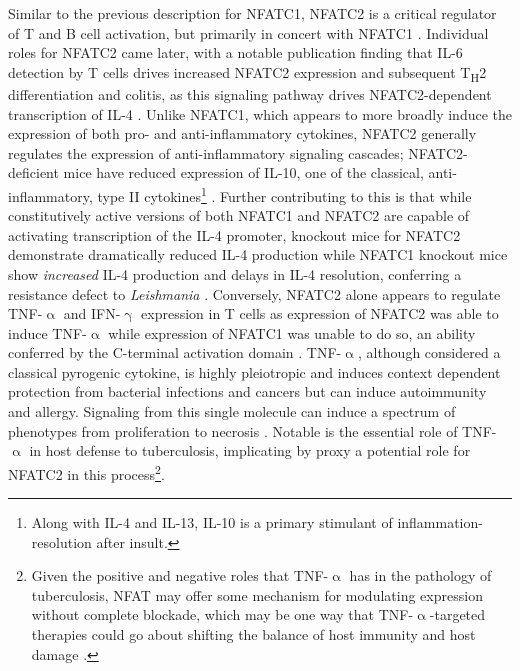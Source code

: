 Similar to the previous description for NFATC1, NFATC2 is a critical regulator of T and B cell activation, but primarily in concert with NFATC1 \citep{Peng2001}. Individual roles for NFATC2 came later, with a notable publication finding that IL\hyp{}6 detection by T cells drives increased NFATC2 expression and subsequent T\textsubscript{H}2 differentiation and colitis, as this signaling pathway drives NFATC2\hyp{}dependent transcription of IL\hyp{}4 \citep{Diehl2002, Weigmann2008}. Unlike NFATC1, which appears to more broadly induce the expression of both pro\hyp{} and anti\hyp{}inflammatory cytokines, NFATC2 generally regulates the expression of anti\hyp{}inflammatory signaling cascades; NFATC2\hyp{}deficient mice have reduced expression of IL\hyp{}10, one of the classical, anti\hyp{}inflammatory, type II cytokines\footnote{Along with IL\hyp{}4 and IL\hyp{}13, IL\hyp{}10 is a primary stimulant of inflammation\hyp{}resolution after insult.} \citep{Lee2009}. Further contributing to this is that while constitutively active versions of both NFATC1 and NFATC2 are capable of activating transcription of the IL\hyp{}4 promoter, knockout mice for NFATC2 demonstrate dramatically reduced IL\hyp{}4 production while NFATC1 knockout mice show \textit{increased} IL\hyp{}4 production \citep{Monticelli2002} and delays in IL\hyp{}4 resolution, conferring a resistance defect to \textit{Leishmania} \citep{Kiani1997}. Conversely, NFATC2 alone appears to regulate TNF\hyp{}$\upalpha$ and IFN\hyp{}$\upgamma$ expression in T cells as expression of NFATC2 was able to induce TNF\hyp{}$\upalpha$ while expression of NFATC1 was unable to do so, an ability conferred by the C\hyp{}terminal activation domain \citep{Kaminuma2008, Teixeira2005}. TNF\hyp{}$\upalpha$, although considered a classical pyrogenic cytokine, is highly pleiotropic and induces context dependent protection from bacterial infections and cancers but can induce autoimmunity and allergy. Signaling from this single molecule can induce a spectrum of phenotypes from proliferation to necrosis \citep{Gough2020}. Notable is the essential role of TNF\hyp{}$\upalpha$ in host defense to tuberculosis, implicating by proxy a potential role for NFATC2 in this process\footnote{Given the positive and negative roles that TNF\hyp{}$\upalpha$ has in the pathology of tuberculosis, NFAT may offer some mechanism for modulating expression without complete blockade, which may be one way that TNF\hyp{}$\upalpha$\hyp{}targeted therapies could go about shifting the balance of host immunity and host damage \citep{Mootoo2009}.}. 


